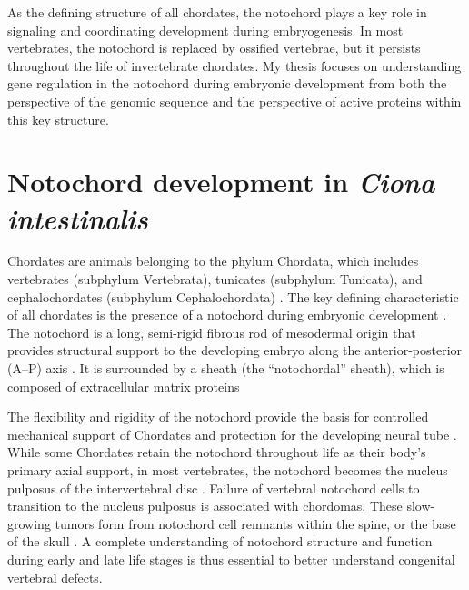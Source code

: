 \begin{dissertationintroduction}
    As the defining structure of all chordates, the notochord plays a key role in signaling and coordinating development during embryogenesis. In most vertebrates, the notochord is replaced by ossified vertebrae, but it persists throughout the life of invertebrate chordates. My thesis focuses on understanding gene regulation in the notochord during embryonic development from both the perspective of the genomic sequence and the perspective of active proteins within this key structure. 
    
    \section{Notochord development in \textit{Ciona intestinalis}}
    Chordates are animals belonging to the phylum Chordata, which includes vertebrates (subphylum Vertebrata), tunicates (subphylum Tunicata), and cephalochordates (subphylum Cephalochordata) \cite{holland2005}. The key defining characteristic of all chordates is the presence of a notochord during embryonic development \cite{stemple2004, holland2005, stemple2005, corallo2015, balmer2016, debree2018}. The notochord is a long, semi-rigid fibrous rod of mesodermal origin that provides structural support to the developing embryo along the anterior-posterior (A–P) axis \cite{stemple2005, corallo2015, balmer2016}. It is surrounded by a sheath (the “notochordal” sheath), which is composed of extracellular matrix proteins \cite{corallo2015, stemple2004, stemple2005}

    The flexibility and rigidity of the notochord provide the basis for controlled mechanical support of Chordates and protection for the developing neural tube \cite{stemple2004, stemple2005, corallo2015, balmer2016}. While some Chordates retain the notochord throughout life as their body’s primary axial support, in most vertebrates, the notochord becomes the nucleus pulposus of the intervertebral disc \cite{stemple2005, corallo2015, lawson2015, balmer2016}. Failure of vertebral notochord cells to transition to the nucleus pulposus is associated with chordomas. These slow-growing tumors form from notochord cell remnants within the spine, or the base of the skull \cite{corallo2015, debree2018}. A complete understanding of notochord structure and function during early and late life stages is thus essential to better understand congenital vertebral defects.



\end{dissertationintroduction}
